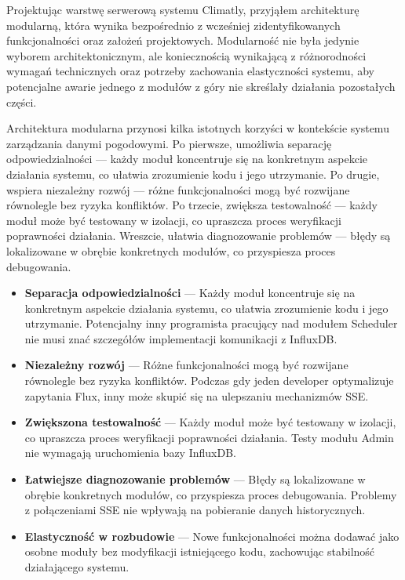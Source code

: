 \documentclass[a4paper,12pt,openany]{book}
\begin{document}
Projektując warstwę serwerową systemu Climatly, przyjąłem architekturę modularną, która wynika bezpośrednio z wcześniej zidentyfikowanych funkcjonalności oraz założeń projektowych. Modularność nie była jedynie wyborem architektonicznym, ale koniecznością wynikającą z różnorodności wymagań technicznych oraz potrzeby zachowania elastyczności systemu, aby potencjalne awarie jednego z modułów z góry nie skreślały działania pozostałych części.

Architektura modularna przynosi kilka istotnych korzyści w kontekście systemu zarządzania danymi pogodowymi. Po pierwsze, umożliwia separację odpowiedzialności — każdy moduł koncentruje się na konkretnym aspekcie działania systemu, co ułatwia zrozumienie kodu i jego utrzymanie. Po drugie, wspiera niezależny rozwój — różne funkcjonalności mogą być rozwijane równolegle bez ryzyka konfliktów. Po trzecie, zwiększa testowalność — każdy moduł może być testowany w izolacji, co upraszcza proces weryfikacji poprawności działania. Wreszcie, ułatwia diagnozowanie problemów — błędy są lokalizowane w obrębie konkretnych modułów, co przyspiesza proces debugowania.

\begin{itemize}[itemsep=3pt,topsep=5pt,parsep=0pt]
\item \textbf{Separacja odpowiedzialności} --- Każdy moduł koncentruje się na konkretnym aspekcie działania systemu, co ułatwia zrozumienie kodu i jego utrzymanie. Potencjalny inny programista pracujący nad modułem Scheduler nie musi znać szczegółów implementacji komunikacji z InfluxDB.

\item \textbf{Niezależny rozwój} --- Różne funkcjonalności mogą być rozwijane równolegle bez ryzyka konfliktów. Podczas gdy jeden developer optymalizuje zapytania Flux, inny może skupić się na ulepszaniu mechanizmów SSE.

\item \textbf{Zwiększona testowalność} --- Każdy moduł może być testowany w izolacji, co upraszcza proces weryfikacji poprawności działania. Testy modułu Admin nie wymagają uruchomienia bazy InfluxDB.

\item \textbf{Łatwiejsze diagnozowanie problemów} --- Błędy są lokalizowane w obrębie konkretnych modułów, co przyspiesza proces debugowania. Problemy z połączeniami SSE nie wpływają na pobieranie danych historycznych.

\item \textbf{Elastyczność w rozbudowie} --- Nowe funkcjonalności można dodawać jako osobne moduły bez modyfikacji istniejącego kodu, zachowując stabilność działającego systemu.
\end{itemize}
\end{document}
